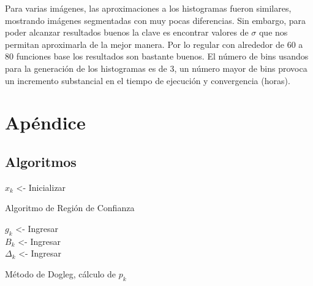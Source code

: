\documentclass[conference]{IEEEtran}
\begin{document}
Para varias imágenes, las aproximaciones a los histogramas fueron similares, mostrando
imágenes segmentadas con muy pocas diferencias. Sin embargo, para poder alcanzar resultados buenos
la clave es encontrar valores de $\sigma$ que nos permitan aproximarla de la mejor manera. Por lo
regular con alrededor de 60 a 80 funciones base los resultados son bastante buenos. El número de
bins usandos para la generación de los histogramas es de 3, un número mayor de bins provoca un
incremento substancial en el tiempo de ejecución y convergencia (horas).


\section{Apéndice}

\subsection{Algoritmos}


\begin{algorithm}[]
    \SetAlgoLined
	$x_k$ <- Inicializar \\
    \caption{Algoritmo de Región de Confianza}
\end{algorithm}

\begin{algorithm}[]
    \SetAlgoLined
	$g_k$ <- Ingresar \\
	$B_k$ <- Ingresar \\
	$\Delta_k$ <- Ingresar \\
    \caption{Método de Dogleg, cálculo de $p_k$}
\end{algorithm}
\end{document}
